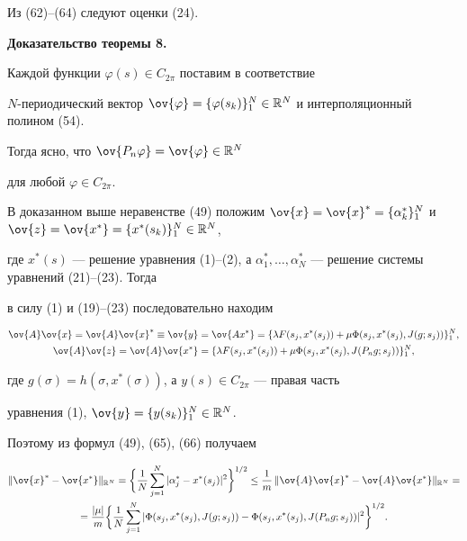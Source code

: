 Из (62)--(64) следуют оценки (24).


\medskip





{\bf Доказательство теоремы 8.}


Каждой функции $\varphi(s)\in C_{2\pi}$ поставим в соответствие


$N$-периодический вектор $\ov{\varphi}=\{ \varphi(s_k)\}_1^N\in


\Bbb R^N$ и интерполяционный полином (54).


Тогда ясно, что $\ov{P_n\varphi}=\ov{\varphi}\in \Bbb R^N$


для любой $\varphi\in C_{2\pi}$.





В доказанном выше неравенстве (49) положим $\ov{x}=\ov{x}^*=


\{\alpha_k^*\}_1^N$ и $\ov{z}=\ov{x^*}=\{ x^*(s_k)\}_1^N\in \Bbb R^N$,


где $x^*(s)$ --- решение уравнения (1)--(2), а $\alpha_1^*,\dotsc,


\alpha_N^*$ --- решение системы уравнений (21)--(23). Тогда


в силу (1) и (19)--(23) последовательно находим


\begin{gather}


\ov{A}\ov{x}=\ov{A}\ov{x}^*\equiv \ov{y}=\ov{Ax^*}=


\{ \lambda F(s_j,x^*(s_j))+\mu \Phi(s_j,x^*(s_j),J(g;s_j))\}_1^N,\\


%


\ov{A}\ov{z}=\ov{A}\ov{x^*}=


\{ \lambda F(s_j,x^*(s_j))+


\mu \Phi(s_j,x^*(s_j),J(P_ng;s_j))\}_1^N,


\end{gather}


где $g(\sigma)=h(\sigma,x^*(\sigma))$, а $y(s)\in C_{2\pi}$ --- правая часть


уравнения (1), $\ov{y}=\{y(s_k)\}_1^N\in \Bbb R^N$.


Поэтому из формул (49), (65), (66) получаем


\begin{multline}


\|\ov{x}^*-\ov{x^*}\|_{\Bbb R^N}=\biggl\{ \frac{1}{N}\sum_{j=1}^N


|\alpha_j^*-x^*(s_j)|^2\biggr\}^{1/2}\leq \frac{1}{m}\,


\|\ov{A}\ov{x}^*-\ov{A}\ov{x^*}\|_{\Bbb R^N}= \\


%


=\frac{|\mu|}{m}\biggl\{ \frac{1}{N}\sum_{j=1}^N| \Phi(s_j,x^*(s_j),


J(g;s_j))- \Phi(s_j,x^*(s_j),J(P_ng;s_j))|^2\biggr\}^{1/2}.


\end{multline}


